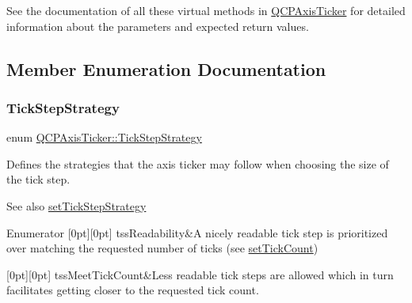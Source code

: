 See the documentation of all these virtual methods in \hyperlink{class_q_c_p_axis_ticker}{Q\+C\+P\+Axis\+Ticker} for detailed information about the parameters and expected return values. 

\subsection{Member Enumeration Documentation}
\mbox{\label{class_q_c_p_axis_ticker_ab6d2f9d9477821623ac9bc4b21ddf49a}} 
\subsubsection{\texorpdfstring{Tick\+Step\+Strategy}{TickStepStrategy}}
{\footnotesize\ttfamily enum \hyperlink{class_q_c_p_axis_ticker_ab6d2f9d9477821623ac9bc4b21ddf49a}{Q\+C\+P\+Axis\+Ticker\+::\+Tick\+Step\+Strategy}}

Defines the strategies that the axis ticker may follow when choosing the size of the tick step.

\begin{DoxySeeAlso}{See also}
\hyperlink{class_q_c_p_axis_ticker_a73b1d847c1a12159af6bfda4ebebe7d5}{set\+Tick\+Step\+Strategy} 
\end{DoxySeeAlso}
\begin{DoxyEnumFields}{Enumerator}
[0pt][0pt]{}\mbox{\label{class_q_c_p_axis_ticker_ab6d2f9d9477821623ac9bc4b21ddf49aa9002aa2fd5633ab5556c71a26fed63a8}} 
tss\+Readability&A nicely readable tick step is prioritized over matching the requested number of ticks (see \hyperlink{class_q_c_p_axis_ticker_a47752abba8293e6dc18491501ae34008}{set\+Tick\+Count}) \\
\hline

[0pt][0pt]{}\mbox{\label{class_q_c_p_axis_ticker_ab6d2f9d9477821623ac9bc4b21ddf49aa770312b6b9b0c64a37ceeba96e0cd7f2}} 
tss\+Meet\+Tick\+Count&Less readable tick steps are allowed which in turn facilitates getting closer to the requested tick count. \\
\hline

\end{DoxyEnumFields}


